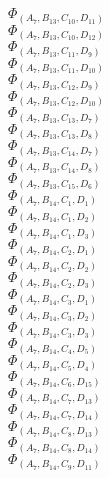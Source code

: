 \documentclass[14pt]{article}
\begin{document}
    $\Phi_{({A}_{7}, {B}_{13}, {C}_{10}, {D}_{11})}$ \\ 
    $\Phi_{({A}_{7}, {B}_{13}, {C}_{10}, {D}_{12})}$ \\ 
    $\Phi_{({A}_{7}, {B}_{13}, {C}_{11}, {D}_{9})}$ \\ 
    $\Phi_{({A}_{7}, {B}_{13}, {C}_{11}, {D}_{10})}$ \\ 
    $\Phi_{({A}_{7}, {B}_{13}, {C}_{12}, {D}_{9})}$ \\ 
    $\Phi_{({A}_{7}, {B}_{13}, {C}_{12}, {D}_{10})}$ \\ 
    $\Phi_{({A}_{7}, {B}_{13}, {C}_{13}, {D}_{7})}$ \\ 
    $\Phi_{({A}_{7}, {B}_{13}, {C}_{13}, {D}_{8})}$ \\ 
    $\Phi_{({A}_{7}, {B}_{13}, {C}_{14}, {D}_{7})}$ \\ 
    $\Phi_{({A}_{7}, {B}_{13}, {C}_{14}, {D}_{8})}$ \\ 
    $\Phi_{({A}_{7}, {B}_{13}, {C}_{15}, {D}_{6})}$ \\ 
    $\Phi_{({A}_{7}, {B}_{14}, {C}_{1}, {D}_{1})}$ \\ 
    $\Phi_{({A}_{7}, {B}_{14}, {C}_{1}, {D}_{2})}$ \\ 
    $\Phi_{({A}_{7}, {B}_{14}, {C}_{1}, {D}_{3})}$ \\ 
    $\Phi_{({A}_{7}, {B}_{14}, {C}_{2}, {D}_{1})}$ \\ 
    $\Phi_{({A}_{7}, {B}_{14}, {C}_{2}, {D}_{2})}$ \\ 
    $\Phi_{({A}_{7}, {B}_{14}, {C}_{2}, {D}_{3})}$ \\ 
    $\Phi_{({A}_{7}, {B}_{14}, {C}_{3}, {D}_{1})}$ \\ 
    $\Phi_{({A}_{7}, {B}_{14}, {C}_{3}, {D}_{2})}$ \\ 
    $\Phi_{({A}_{7}, {B}_{14}, {C}_{3}, {D}_{3})}$ \\ 
    $\Phi_{({A}_{7}, {B}_{14}, {C}_{4}, {D}_{5})}$ \\ 
    $\Phi_{({A}_{7}, {B}_{14}, {C}_{5}, {D}_{4})}$ \\ 
    $\Phi_{({A}_{7}, {B}_{14}, {C}_{6}, {D}_{15})}$ \\ 
    $\Phi_{({A}_{7}, {B}_{14}, {C}_{7}, {D}_{13})}$ \\ 
    $\Phi_{({A}_{7}, {B}_{14}, {C}_{7}, {D}_{14})}$ \\ 
    $\Phi_{({A}_{7}, {B}_{14}, {C}_{8}, {D}_{13})}$ \\ 
    $\Phi_{({A}_{7}, {B}_{14}, {C}_{8}, {D}_{14})}$ \\ 
    $\Phi_{({A}_{7}, {B}_{14}, {C}_{9}, {D}_{11})}$ \\ 
\end{document}
